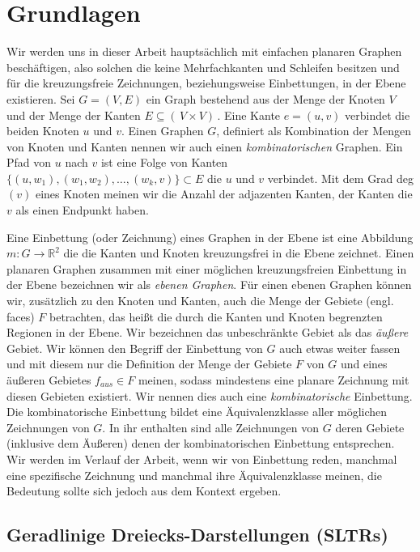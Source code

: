 \chapter{Grundlagen}\label{pre}

Wir werden uns in dieser Arbeit hauptsächlich mit einfachen planaren Graphen beschäftigen, also solchen die keine Mehrfachkanten und Schleifen besitzen und für die kreuzungsfreie Zeichnungen, beziehungsweise Einbettungen, in der Ebene existieren. Sei $G = (V,E)$ ein Graph bestehend aus der Menge der Knoten $V$ und der Menge der Kanten $E \subseteq ( \,V \times V ) \,$. Eine Kante $e=(u,v)$ verbindet die beiden Knoten $u$ und $v$. Einen Graphen $G$, definiert als Kombination der Mengen von Knoten und Kanten nennen wir auch einen \textit{kombinatorischen} Graphen. Ein Pfad von $u$ nach $v$ ist eine Folge von Kanten $\{(u,w_1),(w_1,w_2),\ldots,(w_k,v)\} \subset E$ die $u$ und $v$ verbindet. Mit dem Grad deg$(v)$ eines Knoten meinen wir die Anzahl der adjazenten Kanten, der Kanten die $v$ als einen Endpunkt haben.

Eine Einbettung (oder Zeichnung) eines Graphen in der Ebene ist eine Abbildung $m:G\to\mathbb{R}^2$ die die Kanten und Knoten kreuzungsfrei in die Ebene zeichnet. Einen planaren Graphen zusammen mit einer möglichen kreuzungsfreien Einbettung in der Ebene bezeichnen wir als \textit{ebenen Graphen}. Für einen ebenen Graphen können wir, zusätzlich zu den Knoten und Kanten, auch die Menge der Gebiete (engl. faces) $F$ betrachten, das heißt die durch die Kanten und Knoten begrenzten Regionen in der Ebene. Wir bezeichnen das unbeschränkte Gebiet als das \textit{äußere} Gebiet. Wir können den Begriff der Einbettung von $G$ auch etwas weiter fassen und mit diesem nur die Definition der Menge der Gebiete $F$ von $G$ und eines äußeren Gebietes $f_{aus} \in F$ meinen, sodass mindestens eine planare Zeichnung mit diesen Gebieten existiert. Wir nennen dies auch eine \textit{kombinatorische} Einbettung. Die kombinatorische Einbettung bildet eine Äquivalenzklasse aller möglichen Zeichnungen von $G$. In ihr enthalten sind alle Zeichnungen von $G$ deren Gebiete (inklusive dem Äußeren) denen der kombinatorischen Einbettung entsprechen. Wir werden im Verlauf der Arbeit, wenn wir von Einbettung reden, manchmal eine spezifische Zeichnung und manchmal ihre Äquivalenzklasse meinen, die Bedeutung sollte sich jedoch aus dem Kontext ergeben.

\section{Geradlinige Dreiecks-Darstellungen (SLTRs)}

